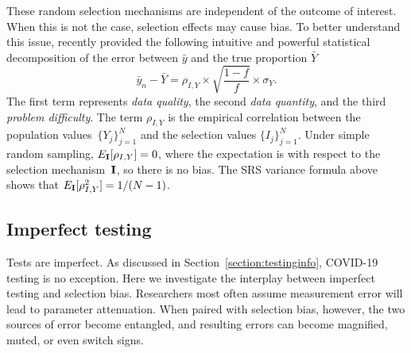 \documentclass[11pt]{amsart}
\numberwithin{equation}{section}
\theoremstyle{plain}
\def\I{\bf I}
\begin{document}
These random selection mechanisms are independent of the outcome of interest. When this is not the case, selection effects may cause bias. To better understand this issue, \cite{Meng2018} recently provided the following intuitive and powerful statistical decomposition of the error between $\bar y$ and the true proportion $\bar Y$
$$
\bar y_n - \bar Y =  \rho_{I, Y} \times \sqrt{\frac{1-f}{f}} \times \sigma_Y.
$$
The first term represents \emph{data quality}, the second \emph{data quantity}, and the third \emph{problem difficulty}. The term $\rho_{I,Y}$ is the empirical correlation between the population values~$\{ Y_j \}_{j=1}^N$ and the selection values $\{ I_j \}_{j=1}^N$.  Under simple random sampling, $E_{\I} [ \rho_{I,Y} ] = 0$, where the expectation is with respect to the selection mechanism~$\I$, so there is no bias.  The SRS variance formula above shows that $E_{\I} [ \rho_{I,Y}^2 ]  = 1/(N-1)$.


\subsection{Imperfect testing}
\label{section:imperfecttesting}

Tests are imperfect.  As discussed in Section~\ref{section:testinginfo}, COVID-19 testing is no exception. Here we investigate the interplay between imperfect testing and selection bias.  Researchers most often assume measurement error will lead to parameter attenuation.  When paired with selection bias, however, the two sources of error become entangled, and resulting errors can become magnified, muted, or even switch signs.
\end{document}
